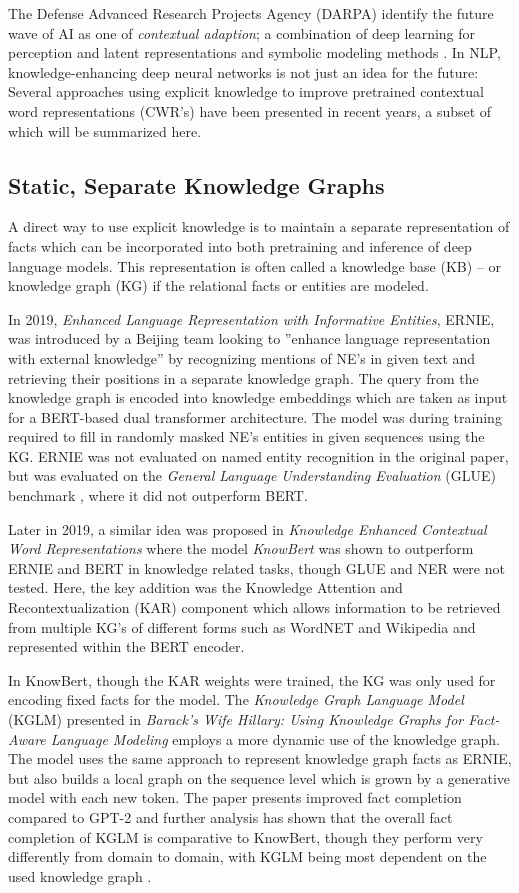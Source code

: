 \documentclass[main.tex]{subfiles}
\begin{document}
The Defense Advanced Research Projects Agency (DARPA) identify the future wave of AI as one of \emph{contextual adaption}; a combination of deep learning for perception and latent representations and symbolic modeling methods \cite{darpa17ai}.
In NLP, knowledge-enhancing deep neural networks is not just an idea for the future:
Several approaches using explicit knowledge to improve pretrained contextual word representations (CWR's) have been presented in recent years, a subset of which will be summarized here.

\subsection{Static, Separate Knowledge Graphs}
A direct way to use explicit knowledge is to maintain a separate representation of facts which can be incorporated into both pretraining and inference of deep language models.
This representation is often called a knowledge base (KB)  -- or knowledge graph (KG) if the relational facts or entities are modeled.

In 2019, \emph{Enhanced Language Representation with Informative Entities}, ERNIE, was introduced by a Beijing team \cite{zhang2019ernie} looking to ''enhance language representation  with  external  knowledge'' \cite[1]{zhang2019ernie} by recognizing mentions of NE's in given text and retrieving their positions in a separate knowledge graph.
The query from the knowledge graph is encoded into knowledge embeddings which are taken as input for a BERT-based dual transformer architecture.
The model was during training required to fill in randomly masked NE's entities in given sequences using the KG.
ERNIE was not evaluated on named entity recognition in the original paper, but was evaluated on the \emph{General Language Understanding Evaluation} (GLUE) benchmark \cite{wang2018glue}, where it did not outperform BERT.

Later in 2019, a similar idea was proposed in \emph{Knowledge Enhanced Contextual Word Representations} where the model \emph{KnowBert} \cite{peters2019knowbert} was shown to outperform ERNIE and BERT in knowledge related tasks, though GLUE and NER were not tested.
Here, the key addition was the Knowledge Attention and Recontextualization (KAR) component which allows information to be retrieved from multiple KG's of different forms such as WordNET and Wikipedia and represented within the BERT encoder.

In KnowBert, though the KAR weights were trained, the KG was only used for encoding fixed facts for the model.
The \emph{Knowledge Graph Language Model} (KGLM) presented in \emph{Barack’s Wife Hillary: Using Knowledge Graphs for Fact-Aware Language Modeling} \cite{logan2019barack} employs a more dynamic use of the knowledge graph.
The model uses the same approach to represent knowledge graph facts as ERNIE, but also builds a local graph on the sequence level which is grown by a generative model with each new token.
The paper presents improved fact completion compared to GPT-2 and further analysis has shown that the overall fact completion of KGLM is comparative to KnowBert, though they perform very differently from domain to domain, with KGLM being most dependent on the used knowledge graph \cite{birk2020knowledge}.
\end{document}
